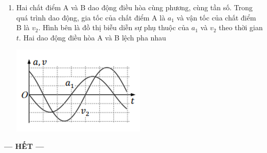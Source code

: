 \begin{enumerate}[label=\bfseries Câu \arabic*:]
\item Hai chất điểm A và B dao động điều hòa cùng phương, cùng tần số. Trong quá trình dao động, gia tốc của chất điểm A là $a_1$ và vận tốc của chất điểm B là $v_2$. Hình bên là đồ thị biễu diễn sự phụ thuộc của $a_1$ và $v_2$ theo thời gian $t$. Hai dao động điều hòa A và B lệch pha nhau
\begin{center}
	\includegraphics[width=0.35\linewidth]{../figs/D11-3-7}
\end{center}
\end{enumerate}
\begin{center}
	\textbf{--- HẾT ---}
\end{center}